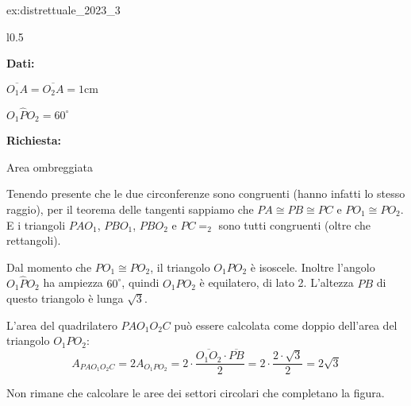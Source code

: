 \begin{soluzione}{ex:distrettuale_2023_3}
\begin{wrapfigure}{l}{0.5\textwidth}
    \end{wrapfigure}

    \textbf{Dati:}

    $\overline{O_1A} = \overline{O_2A} = 1 \text{cm}$

    $O_1\hat{P}O_2 = 60^\circ$

    \textbf{Richiesta:}

    Area ombreggiata

    \bigskip
    Tenendo presente che le due circonferenze sono congruenti (hanno infatti lo stesso raggio), per il teorema
    delle tangenti sappiamo che $PA \cong PB \cong PC$ e $PO_1 \cong PO_2$.
    E i triangoli $PAO_1$, $PBO_1$, $PBO_2$ e $PC=_2$ sono tutti congruenti (oltre che rettangoli).

    Dal momento che $PO_1 \cong PO_2$, il triangolo $O_1 P O_2$ è isoscele.
    Inoltre l'angolo $O_1\hat{P}O_2$ ha ampiezza $60^\circ$, quindi $O_1 P O_2$ è equilatero, di lato 2.
    L'altezza $PB$ di questo triangolo è lunga $\sqrt{3}$.
    
    L'area del quadrilatero $PAO_1 O_2 C$ può essere calcolata come doppio dell'area del triangolo $O_1 P O_2$:
    \begin{equation*}
        A_{PAO_1 O_2 C} = 2 A_{O_1 P O_2} = 2 \cdot \dfrac{\overline{O_1 O_2} \cdot \overline{PB}}{2} = 
        2 \cdot \dfrac{2 \cdot \sqrt{3}}{2} = 2\sqrt {3}
    \end{equation*}

    Non rimane che calcolare le aree dei settori circolari che completano la figura.


\end{soluzione}
